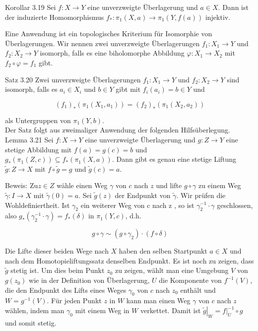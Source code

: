 \documentclass[10pt, letterpaper]{article}
\begin{document}
Korollar 3.19 Sei $f: X \rightarrow Y$ eine unverzweigte Überlagerung und $a \in X$. Dann ist der induzierte Homomorphismus $f_{*}: \pi_{1}(X, a) \rightarrow \pi_{1}(Y, f(a))$ injektiv.

Eine Anwendung ist ein topologisches Kriterium für Isomorphie von Überlagerungen. Wir nennen zwei unverzweigte Überlagerungen $f_{1}: X_{1} \rightarrow Y$ und $f_{2}: X_{2} \rightarrow Y$ isomorph, falls es eine biholomorphe Abbildung $\varphi: X_{1} \rightarrow X_{2}$ mit $f_{2} \circ \varphi=f_{1}$ gibt.

Satz 3.20 Zwei unverzweigte Überlagerungen $f_{1}: X_{1} \rightarrow Y$ und $f_{2}: X_{2} \rightarrow Y$ sind isomorph, falls es $a_{i} \in X_{i}$ und $b \in Y$ gibt mit $f_{i}\left(a_{i}\right)=b \in Y$ und

$$
\left(f_{1}\right)_{*}\left(\pi_{1}\left(X_{1}, a_{1}\right)\right)=\left(f_{2}\right)_{*}\left(\pi_{1}\left(X_{2}, a_{2}\right)\right)
$$

als Untergruppen von $\pi_{1}(Y, b)$.\\
Der Satz folgt aus zweimaliger Anwendung der folgenden Hilfsüberlegung.\\
Lemma 3.21 Sei $f: X \rightarrow Y$ eine unverzweigte Überlagerung und $g: Z \rightarrow Y$ eine stetige Abbildung mit $f(a)=g(c)=b$ und $g_{*}\left(\pi_{1}(Z, c)\right) \subseteq f_{*}\left(\pi_{1}(X, a)\right)$. Dann gibt es genau eine stetige Liftung $\widetilde{g}: Z \rightarrow X$ mit $f \circ \widetilde{g}=g$ und $\widetilde{g}(c)=a$.

Beweis: $\mathrm{Zu} z \in Z$ wähle einen Weg $\gamma$ von $c$ nach $z$ und lifte $g \circ \gamma$ zu einem Weg $\widetilde{\gamma}: I \rightarrow X$ mit $\widetilde{\gamma}(0)=a$. Sei $\widetilde{g}(z)$ der Endpunkt von $\widetilde{\gamma}$. Wir prüfen die Wohldefiniertheit. Ist $\gamma_{2}$ ein weiterer Weg von c nach z , so ist $\gamma_{2}^{-1} \cdot \gamma$ geschlossen, also $g_{*}\left(\gamma_{2}^{-1} \cdot \gamma\right)=f_{*}(\delta)$ in $\pi_{1}(Y, c)$, d.h.

$$
g \circ \gamma \sim\left(g \circ \gamma_{2}\right) \cdot(f \circ \delta)
$$

Die Lifte dieser beiden Wege nach $X$ haben den selben Startpunkt $a \in X$ und nach dem Homotopieliftungssatz denselben Endpunkt. Es ist noch zu zeigen, dass $\widetilde{g}$ stetig ist. Um dies beim Punkt $z_{0}$ zu zeigen, wählt man eine Umgebung $V$ von $g\left(z_{0}\right)$ wie in der Definition von Überlagerung, $U$ die Komponente von $f^{-1}(V)$, die den Endpunkt des Lifts eines Weges $\gamma_{0}$ von $c$ nach $z_{0}$ enthält und $W=g^{-1}(V)$. Für jeden Punkt $z$ in $W$ kann man einen Weg $\gamma$ von $c$ nach $z$ wählen, indem man $\gamma_{0}$ mit einem Weg in $W$ verkettet. Damit ist $\left.\widetilde{g}\right|_{W}=\left.f\right|_{U} ^{-1} \circ g$ und somit stetig.
\end{document}
